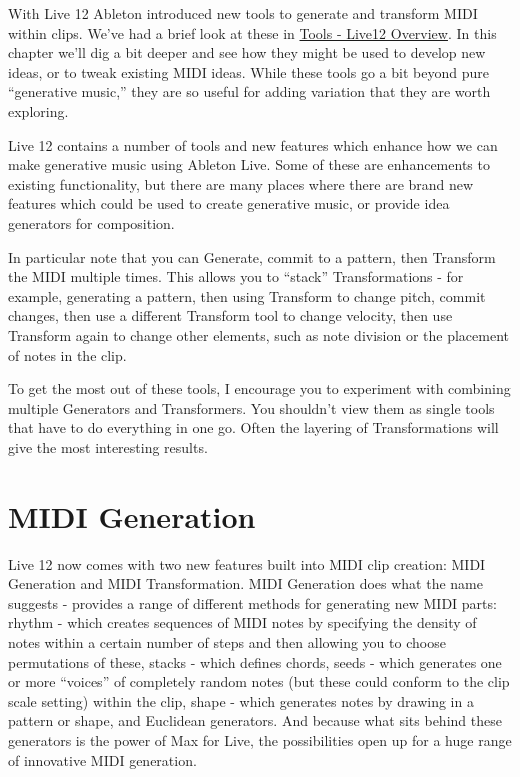 \documentclass[
  12pt,
  letterpaper,
  oneside,
  open=any]{scrbook}
\begin{document}
With Live 12 Ableton introduced new tools to generate and transform MIDI
within clips. We've had a brief look at these in
\hyperref[Chapter-030-Tools-Live12_Intro]{Tools - Live12 Overview}. In
this chapter we'll dig a bit deeper and see how they might be used to
develop new ideas, or to tweak existing MIDI ideas. While these tools go
a bit beyond pure ``generative music,'' they are so useful for adding
variation that they are worth exploring.

\begin{tcolorbox}[enhanced jigsaw, breakable, left=2mm, leftrule=.75mm, toprule=.15mm, opacitybacktitle=0.6, toptitle=1mm, coltitle=black, colback=white, colbacktitle=quarto-callout-tip-color!10!white, opacityback=0, rightrule=.15mm, bottomrule=.15mm, titlerule=0mm, title=\textcolor{quarto-callout-tip-color}{\faLightbulb}\hspace{0.5em}{Key idea}, arc=.35mm, bottomtitle=1mm, colframe=quarto-callout-tip-color-frame]

Live 12 contains a number of tools and new features which enhance how we
can make generative music using Ableton Live. Some of these are
enhancements to existing functionality, but there are many places where
there are brand new features which could be used to create generative
music, or provide idea generators for composition.

In particular note that you can Generate, commit to a pattern, then
Transform the MIDI multiple times. This allows you to ``stack''
Transformations - for example, generating a pattern, then using
Transform to change pitch, commit changes, then use a different
Transform tool to change velocity, then use Transform again to change
other elements, such as note division or the placement of notes in the
clip.

To get the most out of these tools, I encourage you to experiment with
combining multiple Generators and Transformers. You shouldn't view them
as single tools that have to do everything in one go. Often the layering
of Transformations will give the most interesting results.

\end{tcolorbox}

\section{MIDI Generation}\label{midi-generation-1}

Live 12 now comes with two new features built into MIDI clip creation:
MIDI Generation and MIDI Transformation. MIDI Generation does what the
name suggests - provides a range of different methods for generating new
MIDI parts: rhythm - which creates sequences of MIDI notes by specifying
the density of notes within a certain number of steps and then allowing
you to choose permutations of these, stacks - which defines chords,
seeds - which generates one or more ``voices'' of completely random
notes (but these could conform to the clip scale setting) within the
clip, shape - which generates notes by drawing in a pattern or shape,
and Euclidean generators. And because what sits behind these generators
is the power of Max for Live, the possibilities open up for a huge range
of innovative MIDI generation.
\end{document}
